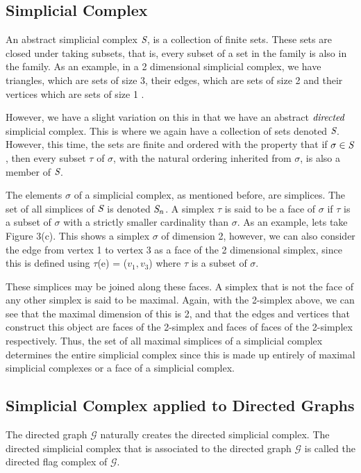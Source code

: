 \subsection{Simplicial Complex}
An abstract simplicial complex $\emph{S}$, is a collection of finite sets. These sets are closed under taking subsets, that is, every subset of a set in the family is also in the family. As an example, in a 2 dimensional simplicial complex, we have triangles, which are sets of size 3, their edges, which are sets of size 2 and their vertices which are sets of size 1 \cite{2008Gregarxiv:0809.4221}.

However, we have a slight variation on this in that we have an abstract $\emph{directed}$ simplicial complex. This is where we again have a collection of sets denoted $\emph{S}$. However, this time, the sets are finite and ordered with the property that if $\sigma \in \emph{S}$, then every subset $\tau$ of $\sigma$, with the natural ordering inherited from $\sigma$, is also a member of $\emph{S}$.

The elements $\sigma$ of a simplicial complex, as mentioned before, are simplices. The set of all simplices of $\emph{S}$ is denoted $\emph{S}_n$. A simplex $\tau$ is said to be a face of $\sigma$ if $\tau$ is a subset of $\sigma$ with a strictly smaller cardinality than $\sigma$. As an example, lets take Figure 3(c). This shows a simplex $\sigma$ of dimension 2, however, we can also consider the edge from vertex 1 to vertex 3 as a face of the 2 dimensional simplex, since this is defined using $\tau$(e) = ($v_1, v_3$) where $\tau$ is a subset of $\sigma$. 

These simplices may be joined along these faces. A simplex that is not the face of any other simplex is said to be maximal. Again, with the 2-simplex above, we can see that the maximal dimension of this is 2, and that the edges and vertices that construct this object are faces of the 2-simplex and faces of faces of the 2-simplex respectively. Thus, the set of all maximal simplices of a simplicial complex determines the entire simplicial complex since this is made up entirely of maximal simplicial complexes or a face of a simplicial complex.

\subsection{Simplicial Complex applied to Directed Graphs}
The directed graph $\mathcal{G}$ naturally creates the directed simplicial complex. The directed simplicial complex that is associated to the directed graph $\mathcal{G}$ is called the directed flag complex of $\mathcal{G}$. 

